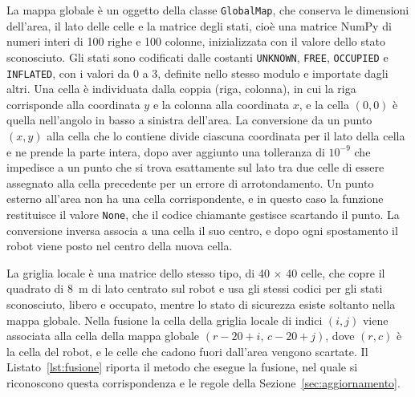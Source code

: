 La mappa globale è un oggetto della classe \texttt{GlobalMap}, che conserva le dimensioni dell'area, il lato delle celle e la matrice degli stati, cioè una matrice NumPy di numeri interi di 100 righe e 100 colonne, inizializzata con il valore dello stato sconosciuto. Gli stati sono codificati dalle costanti \texttt{UNKNOWN}, \texttt{FREE}, \texttt{OCCUPIED} e \texttt{INFLATED}, con i valori da 0 a 3, definite nello stesso modulo e importate dagli altri. Una cella è individuata dalla coppia (riga, colonna), in cui la riga corrisponde alla coordinata $y$ e la colonna alla coordinata $x$, e la cella $(0, 0)$ è quella nell'angolo in basso a sinistra dell'area. La conversione da un punto $(x, y)$ alla cella che lo contiene divide ciascuna coordinata per il lato della cella e ne prende la parte intera, dopo aver aggiunto una tolleranza di $10^{-9}$ che impedisce a un punto che si trova esattamente sul lato tra due celle di essere assegnato alla cella precedente per un errore di arrotondamento. Un punto esterno all'area non ha una cella corrispondente, e in questo caso la funzione restituisce il valore \texttt{None}, che il codice chiamante gestisce scartando il punto. La conversione inversa associa a una cella il suo centro, e dopo ogni spostamento il robot viene posto nel centro della nuova cella.

La griglia locale è una matrice dello stesso tipo, di 40 $\times$ 40 celle, che copre il quadrato di 8~m di lato centrato sul robot e usa gli stessi codici per gli stati sconosciuto, libero e occupato, mentre lo stato di sicurezza esiste soltanto nella mappa globale. Nella fusione la cella della griglia locale di indici $(i, j)$ viene associata alla cella della mappa globale $(r - 20 + i,\, c - 20 + j)$, dove $(r, c)$ è la cella del robot, e le celle che cadono fuori dall'area vengono scartate. Il Listato~\ref{lst:fusione} riporta il metodo che esegue la fusione, nel quale si riconoscono questa corrispondenza e le regole della Sezione~\ref{sec:aggiornamento}.


